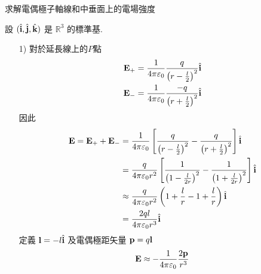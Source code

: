 \begin{problem}
求解電偶極子軸線和中垂面上的電場強度

\end{problem}

\begin{solve}
    設 $(\hat{\mathbf{i}},\hat{\mathbf{j}},\hat{\mathbf{k}})$ 是 $\mathbb{R}^3$ 的標準基.
    \begin{itemize}
        \item[1)]對於延長線上的$P$點
              \begin{align*}
                  \mathbf{E}_+ & = \frac{1}{4\pi\varepsilon_0}\frac{q}{\left(r - \frac{l}{2}\right)^2} \hat{\mathbf{i}}  \\
                  \mathbf{E}_- & = \frac{1}{4\pi\varepsilon_0}\frac{-q}{\left(r + \frac{l}{2}\right)^2} \hat{\mathbf{i}}
              \end{align*}
              因此
              \begin{align*}
                  \mathbf{E} = \mathbf{E}_+ + \mathbf{E}_-
                   & = \frac{1}{4\pi\varepsilon_0}\left[\frac{q}{\left(r-\frac{l}{2}\right)^2}-\frac{q}{\left(r+\frac{l}{2}\right)^2}\right]\hat{\mathbf{i}}      \\
                   & = \frac{q}{4\pi\varepsilon_0r^2}\left[\frac{1}{\left(1-\frac{l}{2r}\right)^2}-\frac{1}{\left(1+\frac{l}{2r}\right)^2}\right]\hat{\mathbf{i}} \\
                   & \approx \frac{q}{4\pi\varepsilon_0r^2} \left(1+\frac{l}{r} - 1 + \frac{l}{r}\right) \hat{\mathbf{i}}                                         \\
                   & = \frac{2ql}{4\pi\varepsilon_0r^3}\hat{\mathbf{i}}
              \end{align*}
              定義 $\mathbf{l} = -l\hat{\mathbf{i}}$ 及電偶極距矢量 $\mathbf{p} = q\mathbf{l}$
              $$
                  \mathbf{E} \approx -\frac{1}{4\pi\varepsilon_0}\frac{2\mathbf{p}}{r^3}
              $$


\end{itemize}
\end{solve}
